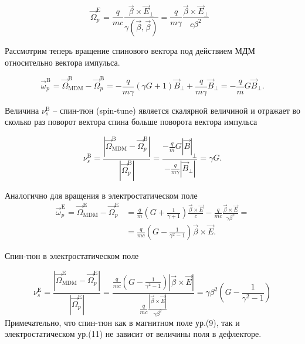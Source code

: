\begin{equation}
{\vec{\Omega}}_p^{\textrm{E}}=\frac{q}{mc}\frac{\vec{\beta}\times{\vec{E}}_\bot}{\gamma(\vec{\beta},\vec{\beta})}=\frac{q}{m\gamma}\frac{\vec{\beta}\times{\vec{E}}_\bot}{c\beta^2}\ \ \ 
\end{equation}

\par Рассмотрим теперь вращение спинового вектора под действием МДМ относительно вектора импульса. 

\begin{equation}
{\vec{\omega}}_p^{\textrm{B}}={\vec{\Omega}}_{\textrm{MDM}}^\textrm{B}-{\vec{\Omega}}_p^{\textrm{B}}=-\frac{q}{m\gamma}\left(\gamma G+1\right){\vec{B}}_\bot+\frac{q}{m\gamma}{\vec{B}}_\bot=-\frac{q}{m}{G\vec{B}}_\bot.
\end{equation}

\noindent Величина $\nu_s^{\textrm{B}}$ – спин-тюн (spin-tune) является скалярной величиной и отражает во сколько раз поворот вектора спина больше поворота вектора импульса

\begin{equation}
\nu_s^{\textrm{B}}=\frac{\left|{\vec{\Omega}}_{\textrm{MDM}}^{\textrm{B}}-{\vec{\Omega}}_p^{\textrm{B}}\right|}{\left|{\vec{\Omega}}_p^{\textrm{B}}\right|}=\frac{-\frac{q}{m}{G\left|\vec{B}\right|}_\bot}{-\frac{q}{m\gamma}\left|{\vec{B}}_\bot\right|}=\gamma G.
\end{equation}

\noindent Аналогично для вращения в электростатическом поле
\begin{equation}
\begin{aligned}
{\vec{\omega}}_p^{\textrm{E}}={\vec{\Omega}}_{\textrm{MDM}}^{\textrm{E}}-{\vec{\Omega}}_p^{\textrm{E}}&=\frac{q}{m}\left(G+\frac{1}{\gamma+1}\right)\frac{\vec{\beta}\times\vec{E}}{c}-\frac{q}{mc}\frac{\vec{\beta}\times\vec{E}}{\gamma\beta^2} =\\
&=\frac{q}{mc}\left(G-\frac{1}{\gamma^2-1}\right)\vec{\beta}\times\vec{E}.
\end{aligned}
\end{equation}

\noindent Спин-тюн в электростатическом поле

\begin{equation}
\nu_s^{\textrm{E}}=\frac{\left|{\vec{\Omega}}_{\textrm{MDM}}^{\textrm{E}}-{\vec{\Omega}}_p^{\textrm{E}}\right|}{\left|{\vec{\Omega}}_p^{\textrm{E}}\right|}=\frac{\frac{q}{mc}\left(G-\frac{1}{\gamma^2-1}\right)\left|\vec{\beta}\times\vec{E}\right|}{\frac{q}{mc}\frac{\left|\vec{\beta}\times\vec{E}\right|}{\gamma\beta^2}}=\gamma\beta^2\left(G-\frac{1}{\gamma^2-1}\right)
\end{equation}
Примечательно, что спин-тюн как в магнитном поле ур.(9), так и  электростатическом ур.(11) не зависит от величины поля в дефлекторе.

